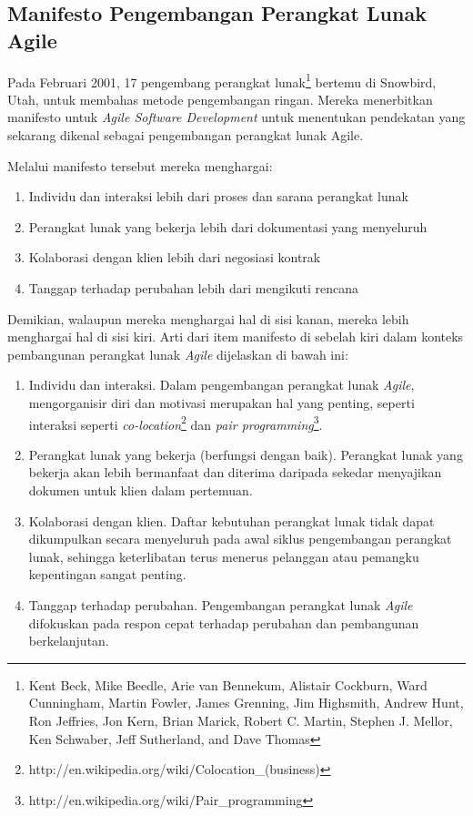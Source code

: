 \documentclass[a4paper, 12pt]{report}
\begin{document}
\subsection{Manifesto Pengembangan Perangkat Lunak Agile}

\onehalfspacing Pada Februari 2001, 17 pengembang perangkat lunak\footnote{Kent Beck, Mike Beedle, Arie van Bennekum, Alistair Cockburn, Ward Cunningham, Martin Fowler, James Grenning, Jim Highsmith, Andrew Hunt, Ron Jeffries, Jon Kern, Brian Marick, Robert C. Martin, Stephen J. Mellor, Ken Schwaber, Jeff Sutherland, and Dave Thomas} bertemu di Snowbird, Utah, untuk membahas metode pengembangan ringan. Mereka menerbitkan manifesto untuk \textit{Agile Software Development} untuk menentukan pendekatan yang sekarang dikenal sebagai pengembangan perangkat lunak Agile\cite{agile-wikipedia}.

\onehalfspacing Melalui manifesto tersebut mereka menghargai\cite{agile-manifesto}:
\begin{enumerate}
  \item Individu dan interaksi lebih dari proses dan sarana perangkat lunak
  \item Perangkat lunak yang bekerja lebih dari dokumentasi yang menyeluruh
  \item Kolaborasi dengan klien lebih dari negosiasi kontrak
  \item Tanggap terhadap perubahan lebih dari mengikuti rencana
\end{enumerate}

\onehalfspacing Demikian, walaupun mereka menghargai hal di sisi kanan, mereka lebih menghargai hal di sisi kiri. Arti dari item manifesto di sebelah kiri dalam konteks pembangunan perangkat lunak \textit{Agile} dijelaskan di bawah ini:

\begin{enumerate}
  \item Individu dan interaksi. Dalam pengembangan perangkat lunak \textit{Agile}, mengorganisir diri dan motivasi merupakan hal yang penting, seperti interaksi seperti \textit{co-location}\footnote{http://en.wikipedia.org/wiki/Colocation\_(business)} dan \textit{pair programming}\footnote{http://en.wikipedia.org/wiki/Pair\_programming}.
  \item Perangkat lunak yang bekerja (berfungsi dengan baik). Perangkat lunak yang bekerja akan lebih bermanfaat dan diterima daripada sekedar menyajikan dokumen untuk klien dalam pertemuan.
  \item Kolaborasi dengan klien. Daftar kebutuhan perangkat lunak tidak dapat dikumpulkan secara menyeluruh pada awal siklus pengembangan perangkat lunak, sehingga keterlibatan terus menerus pelanggan atau pemangku kepentingan sangat penting.
  \item Tanggap terhadap perubahan. Pengembangan perangkat lunak \textit{Agile} difokuskan pada respon cepat terhadap perubahan dan pembangunan berkelanjutan.
\end{enumerate}
\end{document}
